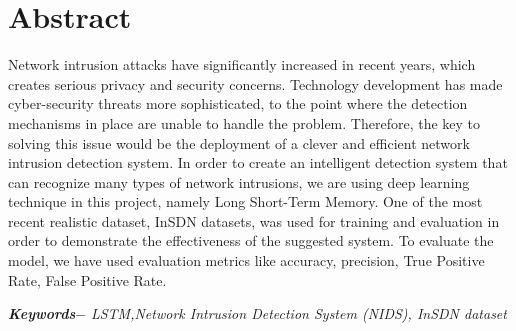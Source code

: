 

\setcounter{tocdepth}{3}
\setcounter{secnumdepth}{3}


\KECcoverpage  
\KECtitlepage
{} %


\KECapproval %

\chapter*{Abstract} %
Network intrusion attacks have significantly increased in recent years, which creates serious privacy and security concerns. Technology development has made cyber-security threats more sophisticated, to the point where the detection mechanisms in place are unable to handle the problem. Therefore, the key to solving this issue would be the deployment of a clever and efficient network intrusion detection system. In order to create an intelligent detection system that can recognize many types of network intrusions, we are using deep learning technique in this project, namely Long Short-Term Memory. One of the most recent realistic dataset, InSDN datasets, was used for training and evaluation in order to demonstrate the effectiveness of the suggested system. To evaluate the model, we have used evaluation metrics like accuracy, precision, True Positive Rate, False Positive Rate.
\par
\textbf{\textit{Keywords$-$}} \emph{LSTM,Network Intrusion Detection System (NIDS), InSDN dataset}

